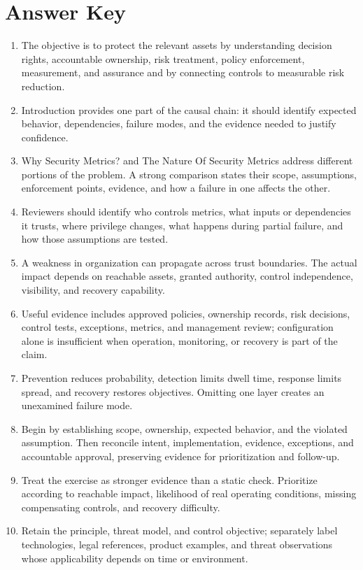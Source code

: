 \documentclass[11pt,letterpaper]{article}
\begin{document}
\section*{Answer Key}
\begin{enumerate}
\item The objective is to protect the relevant assets by understanding decision rights, accountable ownership, risk treatment, policy enforcement, measurement, and assurance and by connecting controls to measurable risk reduction.
\item Introduction provides one part of the causal chain: it should identify expected behavior, dependencies, failure modes, and the evidence needed to justify confidence.
\item Why Security Metrics? and The Nature Of Security Metrics address different portions of the problem. A strong comparison states their scope, assumptions, enforcement points, evidence, and how a failure in one affects the other.
\item Reviewers should identify who controls metrics, what inputs or dependencies it trusts, where privilege changes, what happens during partial failure, and how those assumptions are tested.
\item A weakness in organization can propagate across trust boundaries. The actual impact depends on reachable assets, granted authority, control independence, visibility, and recovery capability.
\item Useful evidence includes approved policies, ownership records, risk decisions, control tests, exceptions, metrics, and management review; configuration alone is insufficient when operation, monitoring, or recovery is part of the claim.
\item Prevention reduces probability, detection limits dwell time, response limits spread, and recovery restores objectives. Omitting one layer creates an unexamined failure mode.
\item Begin by establishing scope, ownership, expected behavior, and the violated assumption. Then reconcile intent, implementation, evidence, exceptions, and accountable approval, preserving evidence for prioritization and follow-up.
\item Treat the exercise as stronger evidence than a static check. Prioritize according to reachable impact, likelihood of real operating conditions, missing compensating controls, and recovery difficulty.
\item Retain the principle, threat model, and control objective; separately label technologies, legal references, product examples, and threat observations whose applicability depends on time or environment.
\end{enumerate}
\end{document}
